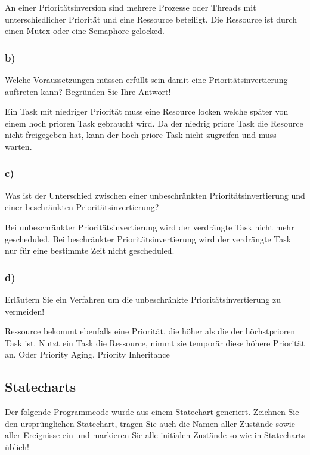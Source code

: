 An einer Prioritätsinversion sind mehrere Prozesse oder Threads mit unterschiedlicher Priorität und eine Ressource beteiligt.
Die Ressource ist durch einen Mutex oder eine Semaphore gelocked.
\subsubsection{b)}
Welche Voraussetzungen müssen erfüllt sein damit eine Prioritätsinvertierung auftreten kann?
Begründen Sie Ihre Antwort!

Ein Task mit niedriger Priorität muss eine Resource locken welche später von einem hoch prioren Task gebraucht wird. 
Da der niedrig priore Task die Resource nicht freigegeben hat, kann der hoch priore Task nicht zugreifen und muss warten.

\subsubsection{c)}
Was ist der Unterschied zwischen einer unbeschränkten Prioritätsinvertierung und einer beschränkten
Prioritätsinvertierung?

Bei unbeschränkter Prioritätsinvertierung wird der verdrängte Task nicht mehr gescheduled. Bei beschränkter Prioritätsinvertierung
wird der verdrängte Task nur für eine bestimmte Zeit nicht gescheduled.

\subsubsection{d)}
Erläutern Sie ein Verfahren um die unbeschränkte Prioritätsinvertierung zu vermeiden!

Ressource bekommt ebenfalls eine Priorität, die höher als die der höchstprioren Task ist.
Nutzt ein Task die Ressource, nimmt sie temporär diese höhere Priorität an. Oder Priority Aging, Priority Inheritance

\subsection{Statecharts}
Der folgende Programmcode wurde aus einem Statechart generiert. Zeichnen Sie den ursprünglichen
Statechart, tragen Sie auch die Namen aller Zustände sowie aller Ereignisse ein und markieren Sie alle
initialen Zustände so wie in Statecharts üblich!

